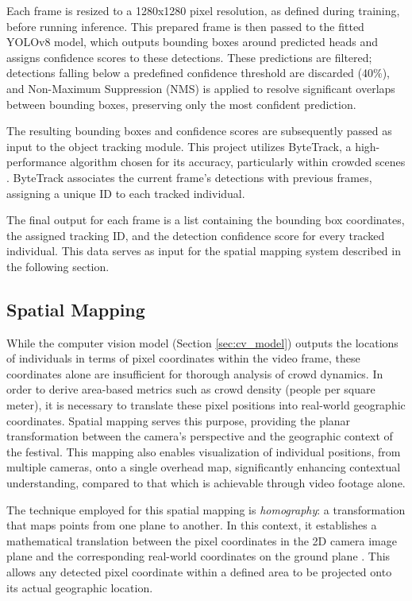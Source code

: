 Each frame is resized to a 1280x1280 pixel resolution, as defined during training, before running inference. This prepared frame is then passed to the fitted YOLOv8 model, which outputs bounding boxes around predicted heads and assigns confidence scores to these detections. These predictions are filtered; detections falling below a predefined confidence threshold are discarded (40\%), and Non-Maximum Suppression (NMS) is applied to resolve significant overlaps between bounding boxes, preserving only the most confident prediction.

The resulting bounding boxes and confidence scores are subsequently passed as input to the object tracking module. This project utilizes ByteTrack, a high-performance algorithm chosen for its accuracy, particularly within crowded scenes \cite{bytetrack}. ByteTrack associates the current frame's detections with previous frames, assigning a unique ID to each tracked individual.

The final output for each frame is a list containing the bounding box coordinates, the assigned tracking ID, and the detection confidence score for every tracked individual. This data serves as input for the spatial mapping system described in the following section.

\subsection{Spatial Mapping}
\label{sec:spatial_mapping}

While the computer vision model (Section \ref{sec:cv_model}) outputs the locations of individuals in terms of pixel coordinates within the video frame, these coordinates alone are insufficient for thorough analysis of crowd dynamics. In order to derive area-based metrics such as crowd density (people per square meter), it is necessary to translate these pixel positions into real-world geographic coordinates. Spatial mapping serves this purpose, providing the planar transformation between the camera's perspective and the geographic context of the festival. This mapping also enables visualization of individual positions, from multiple cameras, onto a single overhead map, significantly enhancing contextual understanding, compared to that which is achievable through video footage alone.

The technique employed for this spatial mapping is \textit{homography}: a transformation that maps points from one plane to another. In this context, it establishes a mathematical translation between the pixel coordinates in the 2D camera image plane and the corresponding real-world coordinates on the ground plane \cite{homography}. This allows any detected pixel coordinate within a defined area to be projected onto its actual geographic location.

